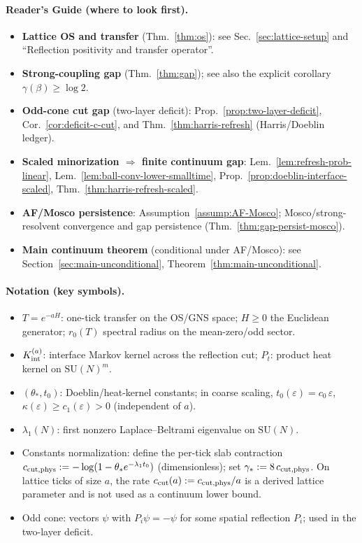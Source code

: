 \documentclass[11pt]{amsart}
\theoremstyle{plain}
\theoremstyle{definition}
\theoremstyle{remark}
\begin{document}
\paragraph{Reader's Guide (where to look first).}
\begin{itemize}
  \item \textbf{Lattice OS and transfer} (Thm.~\ref{thm:os}): see Sec.~\ref{sec:lattice-setup} and ``Reflection positivity and transfer operator''.
  \item \textbf{Strong-coupling gap} (Thm.~\ref{thm:gap}); see also the explicit corollary $\gamma(\beta)\ge \log 2$.
  \item \textbf{Odd-cone cut gap} (two-layer deficit): Prop.~\ref{prop:two-layer-deficit}, Cor.~\ref{cor:deficit-c-cut}, and Thm.~\ref{thm:harris-refresh} (Harris/Doeblin ledger).
  \item \textbf{Scaled minorization $\Rightarrow$ finite continuum gap}: Lem.~\ref{lem:refresh-prob-linear}, Lem.~\ref{lem:ball-conv-lower-smalltime}, Prop.~\ref{prop:doeblin-interface-scaled}, Thm.~\ref{thm:harris-refresh-scaled}.
  \item \textbf{AF/Mosco persistence}: Assumption~\ref{assump:AF-Mosco}; Mosco/strong-resolvent convergence and gap persistence (Thm.~\ref{thm:gap-persist-mosco}).
  \item \textbf{Main continuum theorem} (conditional under AF/Mosco): see Section~\ref{sec:main-unconditional}, Theorem~\ref{thm:main-unconditional}.
\end{itemize}

\paragraph{Notation (key symbols).}
\begin{itemize}
  \item $T=e^{-aH}$: one-tick transfer on the OS/GNS space; $H\ge 0$ the Euclidean generator; $r_0(T)$ spectral radius on the mean-zero/odd sector.
  \item $K_{\rm int}^{(a)}$: interface Markov kernel across the reflection cut; $P_t$: product heat kernel on $\mathrm{SU}(N)^m$.
  \item $(\theta_*,t_0)$: Doeblin/heat-kernel constants; in coarse scaling, $t_0(\varepsilon)=c_0\,\varepsilon$, $\kappa(\varepsilon)\ge c_1(\varepsilon)>0$ (independent of $a$).
  \item $\lambda_1(N)$: first nonzero Laplace--Beltrami eigenvalue on $\mathrm{SU}(N)$.
  \item Constants normalization: define the per-tick slab contraction $c_{\rm cut,phys}:= -\log(1-\theta_* e^{-\lambda_1 t_0})$ (dimensionless); set $\gamma_*:=8\,c_{\rm cut,phys}$. On lattice ticks of size $a$, the rate $c_{\rm cut}(a):=c_{\rm cut,phys}/a$ is a derived lattice parameter and is not used as a continuum lower bound.
  \item Odd cone: vectors $\psi$ with $P_i\psi=-\psi$ for some spatial reflection $P_i$; used in the two-layer deficit.
\end{itemize}
\end{document}
